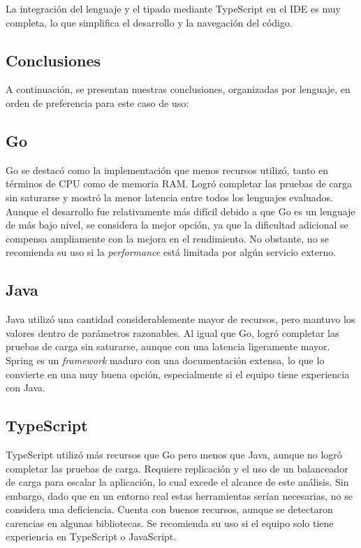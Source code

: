\documentclass[11pt]{article}
\let\Oldsubsection\subsection
\renewcommand{\subsection}{\FloatBarrier\Oldsubsection}
\newcommand{\english}[1]{\textit{#1}}
\begin{document}
La integración del lenguaje y el tipado mediante TypeScript en el IDE es muy completa, lo que simplifica el desarrollo y la navegación del código.

\subsection{Conclusiones}

A continuación, se presentan nuestras conclusiones, organizadas por lenguaje, en orden de preferencia para este caso de uso:

\subsection{Go}
Go se destacó como la implementación que menos recursos utilizó, tanto en términos de CPU como de memoria RAM. Logró completar las pruebas de carga sin saturarse y mostró la menor latencia entre todos los lenguajes evaluados. Aunque el desarrollo fue relativamente más difícil debido a que Go es un lenguaje de más bajo nivel, se considera la mejor opción, ya que la dificultad adicional se compensa ampliamente con la mejora en el rendimiento. No obstante, no se recomienda su uso si la \english{performance} está limitada por algún servicio externo.

\subsection{Java}
Java utilizó una cantidad considerablemente mayor de recursos, pero mantuvo los valores dentro de parámetros razonables. Al igual que Go, logró completar las pruebas de carga sin saturarse, aunque con una latencia ligeramente mayor. Spring es un \textit{framework} maduro con una documentación extensa, lo que lo convierte en una muy buena opción, especialmente si el equipo tiene experiencia con Java.

\subsection{TypeScript}
TypeScript utilizó más recursos que Go pero menos que Java, aunque no logró completar las pruebas de carga. Requiere replicación y el uso de un balanceador de carga para escalar la aplicación, lo cual excede el alcance de este análisis. Sin embargo, dado que en un entorno real estas herramientas serían necesarias, no se considera una deficiencia. Cuenta con buenos recursos, aunque se detectaron carencias en algunas bibliotecas. Se recomienda su uso si el equipo solo tiene experiencia en TypeScript o JavaScript.
\end{document}
